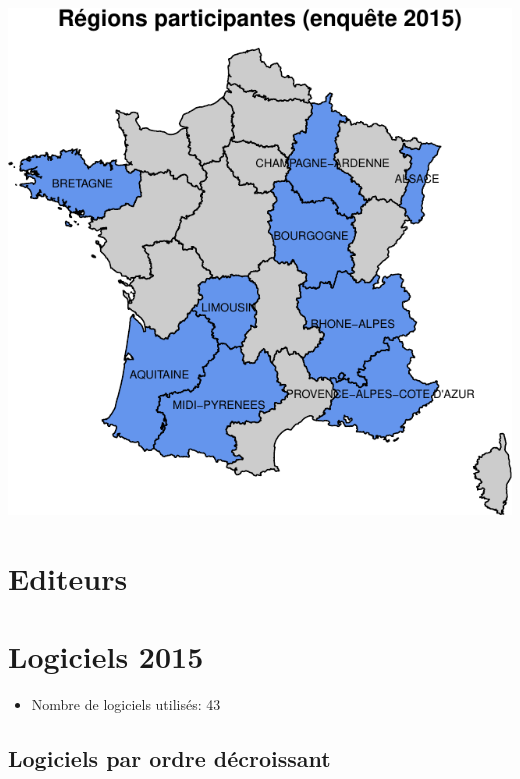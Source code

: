 \documentclass[]{article}
\providecommand{\tightlist}{%
  \setlength{\itemsep}{0pt}\setlength{\parskip}{0pt}}
\begin{document}
\includegraphics{septembre2015_files/figure-latex/carto_region-1.pdf}

\section{Editeurs}\label{editeurs}

\section{Logiciels 2015}\label{logiciels-2015}

\begin{itemize}
\tightlist
\item
  Nombre de logiciels utilisés: 43
\end{itemize}

\subsection{Logiciels par ordre
décroissant}\label{logiciels-par-ordre-decroissant}
\end{document}
